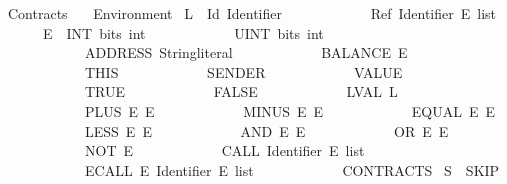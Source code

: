 %
\begin{isabellebody}%
%
%
\isadelimdocument
%
\endisadelimdocument
%
\isatagdocument
%
\isamarkuptrue%
%
\endisatagdocument
{\isafolddocument}%
%
\isadelimdocument
%
\endisadelimdocument
%
\isadelimtheory
%
\endisadelimtheory
%
\isatagtheory
{}\isamarkupfalse%
\ Contracts\isanewline
\ \ \ Environment\isanewline
{}%
\endisatagtheory
{\isafoldtheory}%
%
\isadelimtheory
%
\endisadelimtheory
%
\isadelimdocument
%
\endisadelimdocument
%
\isatagdocument
%
\isamarkuptrue%
%
\endisatagdocument
{\isafolddocument}%
%
\isadelimdocument
%
\endisadelimdocument
{}\isamarkupfalse%
\ L\ {\isacharequal}{\kern0pt}\ Id\ Identifier\isanewline
\ \ \ \ \ \ \ \ \ \ \ {\isacharbar}{\kern0pt}\ Ref\ Identifier\ {\isachardoublequoteopen}E\ list{\isachardoublequoteclose}\isanewline
{}\ \ \ \ \ \ E\ {\isacharequal}{\kern0pt}\ INT\ bits\ int\isanewline
\ \ \ \ \ \ \ \ \ \ \ {\isacharbar}{\kern0pt}\ UINT\ bits\ int\isanewline
\ \ \ \ \ \ \ \ \ \ \ {\isacharbar}{\kern0pt}\ ADDRESS\ String{\isachardot}{\kern0pt}literal\isanewline
\ \ \ \ \ \ \ \ \ \ \ {\isacharbar}{\kern0pt}\ BALANCE\ E\isanewline
\ \ \ \ \ \ \ \ \ \ \ {\isacharbar}{\kern0pt}\ THIS\isanewline
\ \ \ \ \ \ \ \ \ \ \ {\isacharbar}{\kern0pt}\ SENDER\isanewline
\ \ \ \ \ \ \ \ \ \ \ {\isacharbar}{\kern0pt}\ VALUE\isanewline
\ \ \ \ \ \ \ \ \ \ \ {\isacharbar}{\kern0pt}\ TRUE\isanewline
\ \ \ \ \ \ \ \ \ \ \ {\isacharbar}{\kern0pt}\ FALSE\isanewline
\ \ \ \ \ \ \ \ \ \ \ {\isacharbar}{\kern0pt}\ LVAL\ L\isanewline
\ \ \ \ \ \ \ \ \ \ \ {\isacharbar}{\kern0pt}\ PLUS\ E\ E\isanewline
\ \ \ \ \ \ \ \ \ \ \ {\isacharbar}{\kern0pt}\ MINUS\ E\ E\isanewline
\ \ \ \ \ \ \ \ \ \ \ {\isacharbar}{\kern0pt}\ EQUAL\ E\ E\isanewline
\ \ \ \ \ \ \ \ \ \ \ {\isacharbar}{\kern0pt}\ LESS\ E\ E\isanewline
\ \ \ \ \ \ \ \ \ \ \ {\isacharbar}{\kern0pt}\ AND\ E\ E\isanewline
\ \ \ \ \ \ \ \ \ \ \ {\isacharbar}{\kern0pt}\ OR\ E\ E\isanewline
\ \ \ \ \ \ \ \ \ \ \ {\isacharbar}{\kern0pt}\ NOT\ E\isanewline
\ \ \ \ \ \ \ \ \ \ \ {\isacharbar}{\kern0pt}\ CALL\ Identifier\ {\isachardoublequoteopen}E\ list{\isachardoublequoteclose}\isanewline
\ \ \ \ \ \ \ \ \ \ \ {\isacharbar}{\kern0pt}\ ECALL\ E\ Identifier\ {\isachardoublequoteopen}E\ list{\isachardoublequoteclose}\isanewline
\ \ \ \ \ \ \ \ \ \ \ {\isacharbar}{\kern0pt}\ CONTRACTS\isanewline
\isanewline
{}\isamarkupfalse%
\ S\ {\isacharequal}{\kern0pt}\ SKIP\isanewline

\end{isabellebody}

